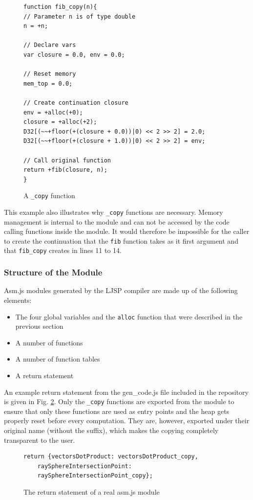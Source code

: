 \documentclass[11pt]{report}
\begin{document}
\begin{figure}[ht]
\begin{lstlisting}
function fib_copy(n){
// Parameter n is of type double
n = +n;

// Declare vars
var closure = 0.0, env = 0.0;

// Reset memory
mem_top = 0.0;

// Create continuation closure
env = +alloc(+0);
closure = +alloc(+2);
D32[(~~+floor(+(closure + 0.0))|0) << 2 >> 2] = 2.0;
D32[(~~+floor(+(closure + 1.0))|0) << 2 >> 2] = env;

// Call original function
return +fib(closure, n);
}
\end{lstlisting}
\caption{A \texttt{_copy} function}
\label{iasmjsmm4}
\end{figure}

This example also illustrates why \texttt{_copy} functions are necessary. Memory management is internal to the module and can not be accessed by the code calling functions inside the module. It would therefore be impossible for the caller to create the continuation that the \texttt{fib} function takes as it first argument and that \texttt{fib_copy} creates in lines 11 to 14.

\subsubsection{Structure of the Module}

Asm.js modules generated by the LJSP compiler are made up of the following elements:
\begin{itemize}
\item The four global variables and the \texttt{alloc} function that were described in the previous section
\item A number of functions
\item A number of function tables
\item A return statement
\end{itemize}

An example return statement from the gen_code.js file included in the repository is given in Fig. \ref{iasmjsmm5}. Only the \texttt{_copy} functions are exported from the module to ensure that only these functions are used as entry points and the heap gets properly reset before every computation. They are, however, exported under their original name (without the suffix), which makes the copying completely transparent to the user.

\begin{figure}[ht]
\begin{lstlisting}
return {vectorsDotProduct: vectorsDotProduct_copy, 
    raySphereIntersectionPoint: 
    raySphereIntersectionPoint_copy};
\end{lstlisting}
\caption{The return statement of a real asm.js module}
\label{iasmjsmm5}
\end{figure}
\end{document}
